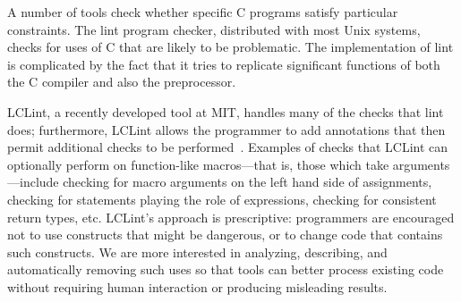A number of tools check whether specific C programs
satisfy particular constraints.  The lint program checker, distributed
with most Unix systems, checks for uses of C that are likely to be
problematic.  The implementation of lint is complicated by the fact
that it tries to replicate significant functions of both the C
compiler and also the preprocessor.

LCLint, a recently developed tool
at MIT, handles many of the checks that lint does; furthermore, LCLint
allows the programmer to add annotations that then permit additional
checks to be performed~\cite{Evans-pldi96,Evans-fse94}.
Examples of checks that LCLint can optionally perform on function-like
macros---that is, those which take arguments---include checking for
macro arguments on the left hand side of assignments, checking for statements
playing the role of expressions, checking for consistent return types, etc.
LCLint's approach is prescriptive: programmers are encouraged not to use
constructs that might be dangerous, or to change code that contains such
constructs.  We are more interested in analyzing, describing, and
automatically removing such uses so that tools can better process existing
code without requiring human interaction or producing misleading results.



